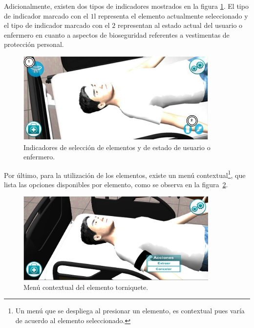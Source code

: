 Adicionalmente, existen dos tipos de indicadores mostrados en la figura
\ref{fig:hemocultivo_seleccion}. El tipo de indicador marcado con el $1$l
representa el elemento actualmente seleccionado y el tipo de indicador marcado
con el $2$ representan al estado actual del usuario o enfermero en cuanto a
aspectos de bioseguridad referentes a vestimentas de protección personal.

\begin{figure}[H]
\centering
\includegraphics[width=10cm]{solucion/images/hemocultivo_seleccion.jpg}
\caption{Indicadores de selección de elementos y de estado de usuario o enfermero.}
\label{fig:hemocultivo_seleccion}
\end{figure}



Por último, para la utilización de los elementos, existe un menú contextual\footnote{Un menú
    que se despliega al presionar un elemento, es contextual pues varía de
    acuerdo al elemento seleccionado.}, que lista las opciones disponibles por
elemento, como se observa en la figura~\ref{fig:hemocultivo_torniquete_cm}.

\begin{figure}[H]
\centering
\includegraphics[width=10cm]{solucion/images/hemocultivo_contextual.jpg}
\caption{Menú contextual del elemento torniquete.}
\label{fig:hemocultivo_torniquete_cm}
\end{figure}

